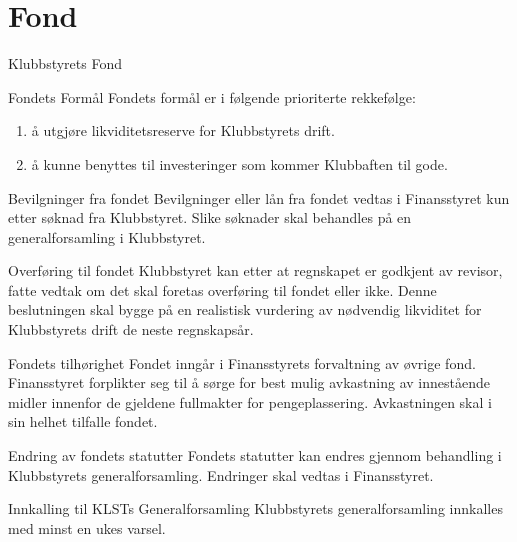 \chapter{Fond}

\begin{fond}{Klubbstyrets Fond}
    \begin{fondsparagraf}{Fondets Formål}
        Fondets formål er i følgende prioriterte rekkefølge:
        \begin{enumerate}
            \item å utgjøre likviditetsreserve for Klubbstyrets drift.
            \item å kunne benyttes til investeringer som kommer Klubbaften til gode.
        \end{enumerate}
    \end{fondsparagraf}

    \begin{fondsparagraf}{Bevilgninger fra fondet}
        Bevilgninger eller lån fra fondet vedtas i Finansstyret kun etter søknad fra
        Klubbstyret. Slike søknader skal behandles på en generalforsamling i Klubbstyret.
    \end{fondsparagraf}

    \begin{fondsparagraf}{Overføring til fondet}
Klubbstyret kan etter at regnskapet er godkjent av revisor, fatte vedtak om det skal foretas overføring til fondet eller
ikke. Denne beslutningen skal bygge på en realistisk vurdering av nødvendig likviditet for Klubbstyrets drift de neste
regnskapsår.
    \end{fondsparagraf}
    
    \begin{fondsparagraf}{Fondets tilhørighet}
Fondet inngår i Finansstyrets forvaltning av øvrige fond. Finansstyret forplikter seg til å sørge for best mulig
avkastning av innestående midler innenfor de gjeldene fullmakter for pengeplassering. Avkastningen skal i sin helhet
tilfalle fondet.
    \end{fondsparagraf}
    
    \begin{fondsparagraf}{Endring av fondets statutter}
Fondets statutter kan endres gjennom behandling i Klubbstyrets generalforsamling. Endringer skal vedtas i
Finansstyret.
    \end{fondsparagraf}
    
    \begin{fondsparagraf}{Innkalling til KLSTs Generalforsamling}
Klubbstyrets generalforsamling innkalles med minst en ukes varsel.
    \end{fondsparagraf}

\end{fond}



